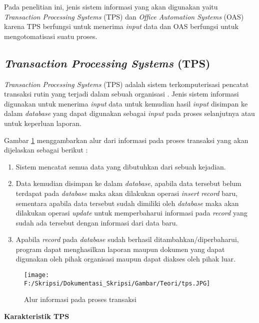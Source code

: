 	Pada penelitian ini, jenis sistem informasi yang akan digunakan yaitu \textit{Transaction Processing Systems} (TPS) dan \textit{Office Automation Systems} (OAS) karena TPS berfungsi untuk menerima \textit{input} data dan OAS berfungsi untuk mengotomatisasi suatu proses.

\subsection{\textit{Transaction Processing Systems} (TPS)}
\label{sec:transaction_processing_systems}
\textit{Transaction Processing Systems} (TPS) adalah sistem terkomputerisasi pencatat transaksi rutin yang terjadi dalam sebuah organisasi \cite{Laudon:2011}. Jenis sistem informasi digunakan untuk menerima \textit{input} data untuk kemudian hasil \textit{input} disimpan ke dalam \textit{database} yang dapat digunakan sebagai \textit{input} pada proses selanjutnya atau untuk keperluan laporan.

Gambar \ref{fig:tps} menggambarkan alur dari informasi pada proses transaksi yang akan dijelaskan sebagai berikut : 
\begin{enumerate}
	\item Sistem mencatat semua data yang dibutuhkan dari sebuah kejadian.
	\item Data kemudian disimpan ke dalam \textit{database}, apabila data tersebut belum terdapat pada \textit{database} maka akan dilakukan operasi \textit{insert} \textit{record} baru, sementara apabila data tersebut sudah dimiliki oleh \textit{database} maka akan dilakukan operasi \textit{update} untuk memperbaharui informasi pada \textit{record} yang sudah ada tersebut dengan informasi dari data baru.
	\item Apabila \textit{record} pada \textit{database} sudah berhasil ditambahkan/diperbaharui, program dapat menghasilkan laporan maupun dokumen yang dapat digunakan oleh pihak organisasi maupun dapat diakses oleh pihak luar.
\end{enumerate}

\begin{figure}[H]
	\centering
		\texttt{[image: F:/Skripsi/Dokumentasi\_Skripsi/Gambar/Teori/tps.JPG]}
		{\caption{Alur informasi pada proses transaksi} \cite{Turban:2001}}
	\label{fig:tps}
\end{figure}

\textbf{Karakteristik TPS}\\

